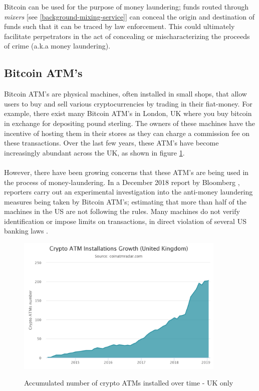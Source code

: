 Bitcoin can be used for the purpose of money laundering; funds routed through \textit{mixers} [see \ref{background-mixing-service}] can conceal the origin and destination of funds such that it can be traced by law enforcement. This could ultimately facilitate perpetrators in the act of concealing or mischaracterizing the proceeds of crime (a.k.a money laundering). 

\subsection{Bitcoin ATM's}
Bitcoin ATM's are physical machines, often installed in small shops, that allow users to buy and sell various cryptocurrencies by trading in their \gls{fiat-money}. For example, there exist many Bitcoin ATM's in London, UK where you buy bitcoin in exchange for depositing pound sterling. The owners of these machines have the incentive of hosting them in their stores as they can charge a commission fee on these transactions. Over the last few years, these ATM's have become increasingly abundant across the UK, as shown in figure \ref{fig:background-atm-growth}. 
\\\\
However, there have been growing concerns that these ATM's are being used in the process of money-laundering. In a December 2018 report by Bloomberg \cite{RefWorks:doc:5c4af4bfe4b0686b56fa4839}, reporters carry out an experimental investigation into the anti-money laundering measures being taken by Bitcoin ATM's; estimating that more than half of the machines in the US are not following the rules. Many machines do not verify identification or impose limits on transactions, in direct violation of several US banking laws \cite{RefWorks:doc:5c4af4bfe4b0686b56fa4839}. 

\begin{figure}[h!]
  \centering
  \includegraphics[width = 10cm]{./figures/atm-installs-uk}\\[0.5cm] 
  \caption{Accumulated number of crypto ATMs installed over time - UK only \protect \footnotemark}
  \label{fig:background-atm-growth}
\end{figure}

